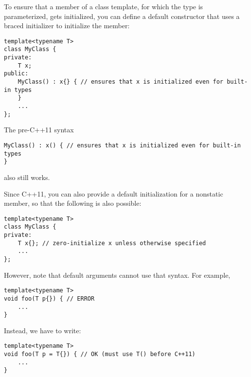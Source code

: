 To ensure that a member of a class template, for which the type is parameterized, gets initialized, you can define a default constructor that uses a braced initializer to initialize the member:

\begin{lstlisting}[style=styleCXX]
template<typename T>
class MyClass {
private:
	T x;
public:
	MyClass() : x{} { // ensures that x is initialized even for built-in types
	}
	...
};
\end{lstlisting}

The pre-C++11 syntax

\begin{lstlisting}[style=styleCXX]
MyClass() : x() { // ensures that x is initialized even for built-in types
}
\end{lstlisting}

also still works.

Since C++11, you can also provide a default initialization for a nonstatic member, so that the following is also possible:

\begin{lstlisting}[style=styleCXX]
template<typename T>
class MyClass {
private:
	T x{}; // zero-initialize x unless otherwise specified
	...
};
\end{lstlisting}

However, note that default arguments cannot use that syntax. For example,

\begin{lstlisting}[style=styleCXX]
template<typename T>
void foo(T p{}) { // ERROR
	...
}
\end{lstlisting}

Instead, we have to write:

\begin{lstlisting}[style=styleCXX]
template<typename T>
void foo(T p = T{}) { // OK (must use T() before C++11)
	...
}
\end{lstlisting}





















